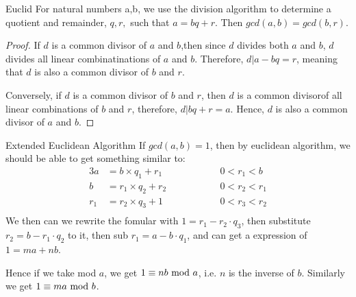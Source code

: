 
\begin{mysubsection}{}
    \begin{theorem}[thm:]{Euclid}
        For natural numbers a,b, we use the division algorithm to determine a quotient and remainder, $q,r,$ such that $a=bq+r$. Then $gcd(a,b) = gcd(b,r)$.
    \end{theorem}

    \begin{proof}
        If $d$ is a common divisor of $a$ and $b$,then since $d$ divides both $a$ and $b$, $d$ divides all linear combinatinations of $a$ and $b$.  Therefore, $d|a-bq=r$, meaning that $d$ is also a common divisor of $b$ and $r$.

        Conversely, if $d$ is a common divisor of $b$ and $r$, then $d$ is a common divisorof all linear combinations of $b$ and $r$, therefore, $d|bq+r=a$.  Hence, $d$ is also a common divisor of $a$ and $b$.
    \end{proof}
\end{mysubsection}

\begin{mysubsection}{Extended Euclidean Algorithm}
    If $gcd(a,b)=1$, then by euclidean algorithm, we should be able to get something similar to:
    \begin{alignat*}{3}
        a&=b\times q_1 + r_1 &&\qquad \qquad 0<r_1<b\\
        b&=r_1\times q_2 + r_2 &&\qquad \qquad 0<r_2<r_1\\
        r_1&=r_2\times q_3 + 1 &&\qquad \qquad 0<r_3<r_2\\
    \end{alignat*}
    We then can we rewrite the fomular with $1=r_1-r_2\cdot q_3$, then substitute $r_2=b-r_1\cdot q_2$ to it, then sub $r_1=a-b\cdot q_1$, and can get a expression of $1=ma+nb$.

    Hence if we take mod $a$, we get $1\equiv nb\textnormal{ mod }a$, i.e. $n$ is the inverse of $b$. Similarly we get $1\equiv ma\textnormal{ mod }b$.
\end{mysubsection}

